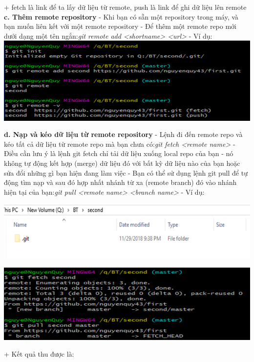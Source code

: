 \documentclass[12pt,a4paper]{report}
\begin{document}
	\label{fig:screenshot033}
\vskip 0.4cm\vskip 0.4cm
+ fetch là link để ta lấy dữ liệu từ remote, push là link để ghi dữ liệu lên remote\vskip 0.4cm
{\bf c. Thêm remote repository}\vskip 0.4cm
- Khi bạn có sẵn một repository trong máy, và bạn muốn liên kết với một remote repository\vskip 0.4cm
- Để thêm một remote repo mới dưới dạng một tên ngắn:{\it git remote add <shortname> <url>}\vskip 0.4cm
- Ví dụ: 
\vskip 0.4cm
	\includegraphics[width=0.8\linewidth]{screenshot034}
	
	\label{fig:screenshot034}
\vskip 0.4cm\vskip 0.4cm
{\bf d. Nạp và kéo dữ liệu từ remote repository} \vskip 0.4cm
- Lệnh đi đến remote repo và kéo tất cả dữ liệu từ remote repo mà bạn chưa có:{\it git fetch <remote name>}\vskip 0.4cm
- Điều cần lưu ý là lệnh git fetch chỉ tải dữ liệu xuống  local repo của bạn - nó không tự động kết hợp (merge) dữ liệu đó với bất kỳ dữ liệu nào của bạn hoặc sửa đổi những gì bạn hiện đang làm việc\vskip 0.4cm
- Bạn có thể sử dụng lệnh git pull để tự động tìm nạp và sau đó hợp nhất nhánh từ xa (remote branch) đó vào nhánh hiện tại của bạn:{\it git pull <remote name> <branch name>}\vskip 0.4cm
- Ví dụ: \vskip 0.4cm

	\includegraphics[width=0.8\linewidth]{screenshot035}

	\label{fig:screenshot035}

\vskip 0.4cm\vskip 0.4cm
	\includegraphics[width=0.8\linewidth]{screenshot036}

	\label{fig:screenshot036}
\vskip 0.4cm\vskip 0.4cm
+ Kết quả thu được là: \vskip 0.4cm
\end{document}
